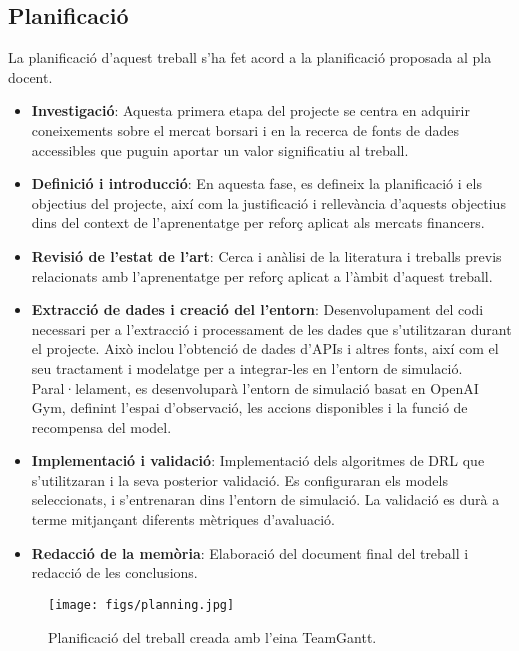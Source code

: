 \documentclass[12pt,a4paper,twoside]{book}
\begin{document}
\subsection{Planificació}
La planificació d'aquest treball s'ha fet acord a la planificació proposada al pla docent.
\begin{itemize}

    \item  \textbf{Investigació}: Aquesta primera etapa del projecte se centra en adquirir coneixements sobre el mercat borsari i en la recerca de fonts de dades accessibles que puguin aportar un valor significatiu al treball.

    \item \textbf{Definició i introducció}: En aquesta fase, es defineix la planificació i els objectius del projecte, així com la justificació i rellevància d'aquests objectius dins del context de l'aprenentatge per reforç aplicat als mercats financers.

    \item \textbf{Revisió de l'estat de l'art}: Cerca i anàlisi de la literatura i treballs previs relacionats amb l'aprenentatge per reforç aplicat a l'àmbit d'aquest treball.
    \item \textbf{Extracció de dades i creació del l'entorn}: Desenvolupament del codi necessari per a l'extracció i processament de les dades que s'utilitzaran durant el projecte. Això inclou l'obtenció de dades d'APIs i altres fonts, així com el seu tractament i modelatge per a integrar-les en l'entorn de simulació. Paral·lelament, es desenvoluparà l'entorn de simulació basat en OpenAI Gym, definint l'espai d'observació, les accions disponibles i la funció de recompensa del model.

    \item \textbf{Implementació i validació}: Implementació dels algoritmes de DRL que s'utilitzaran i la seva posterior validació. Es configuraran els models seleccionats, i s'entrenaran dins l'entorn de simulació. La validació es durà a terme mitjançant diferents mètriques d'avaluació.

    \item \textbf{Redacció de la memòria}: Elaboració del document final del treball i redacció de les conclusions.

\end{itemize}

\begin{figure}[H]
	\centering
	\texttt{[image: figs/planning.jpg]}
	\caption{Planificació del treball creada amb l'eina TeamGantt\cite{TeamGantt}.}
	\label{fig:context-anoni1}
\end{figure}
\end{document}
